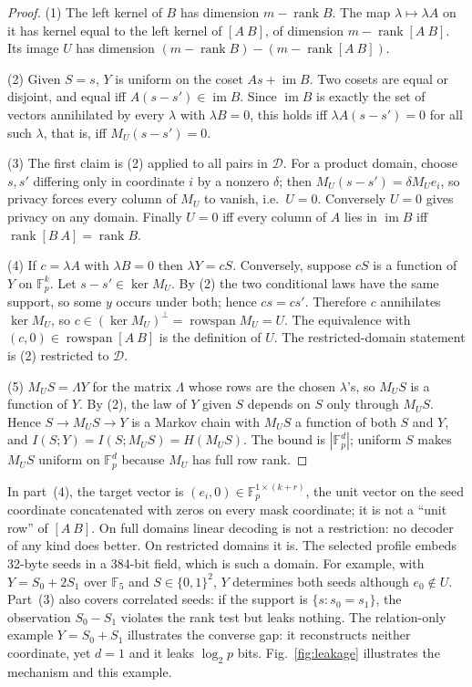 \documentclass[pdflatex,sn-mathphys-num]{sn-jnl}%
\theoremstyle{plain}
\theoremstyle{definition}
\newcommand{\F}{\mathbb{F}}
\newcommand{\rk}{\operatorname{rank}}
\newcommand{\im}{\operatorname{im}}
\begin{document}
\begin{proof}
(1) The left kernel of $B$ has dimension $m-\rk B$. The map $\lambda\mapsto\lambda A$ on it has kernel equal to the left kernel of $[A\ B]$, of dimension $m-\rk[A\ B]$. Its image $U$ has dimension $(m-\rk B)-(m-\rk[A\ B])$.

(2) Given $S=s$, $Y$ is uniform on the coset $As+\im B$. Two cosets are equal or disjoint, and equal iff $A(s-s')\in\im B$. Since $\im B$ is exactly the set of vectors annihilated by every $\lambda$ with $\lambda B=0$, this holds iff $\lambda A(s-s')=0$ for all such $\lambda$, that is, iff $M_U(s-s')=0$.

(3) The first claim is (2) applied to all pairs in $\mathcal D$. For a product domain, choose $s,s'$ differing only in coordinate $i$ by a nonzero $\delta$; then $M_U(s-s')=\delta M_U e_i$, so privacy forces every column of $M_U$ to vanish, i.e.\ $U=0$. Conversely $U=0$ gives privacy on any domain. Finally $U=0$ iff every column of $A$ lies in $\im B$ iff $\rk[B\ A]=\rk B$.

(4) If $c=\lambda A$ with $\lambda B=0$ then $\lambda Y=cS$. Conversely, suppose $cS$ is a function of $Y$ on $\F_p^k$. Let $s-s'\in\ker M_U$. By (2) the two conditional laws have the same support, so some $y$ occurs under both; hence $cs=cs'$. Therefore $c$ annihilates $\ker M_U$, so $c\in(\ker M_U)^\perp=\operatorname{rowspan}M_U=U$. The equivalence with $(c,0)\in\operatorname{rowspan}[A\ B]$ is the definition of $U$. The restricted-domain statement is (2) restricted to $\mathcal D$.

(5) $M_US=\Lambda Y$ for the matrix $\Lambda$ whose rows are the chosen $\lambda$'s, so $M_US$ is a function of $Y$. By (2), the law of $Y$ given $S$ depends on $S$ only through $M_US$. Hence $S\to M_US\to Y$ is a Markov chain with $M_US$ a function of both $S$ and $Y$, and $I(S;Y)=I(S;M_US)=H(M_US)$. The bound is $|\F_p^d|$; uniform $S$ makes $M_US$ uniform on $\F_p^d$ because $M_U$ has full row rank.
\end{proof}

In part~(4), the target vector is $(e_i,0)\in\F_p^{1\times(k+r)}$, the unit vector on the seed coordinate concatenated with zeros on every mask coordinate; it is not a ``unit row'' of $[A\ B]$. On full domains linear decoding is not a restriction: no decoder of any kind does better. On restricted domains it is. The selected profile embeds 32-byte seeds in a 384-bit field, which is such a domain. For example, with $Y=S_0+2S_1$ over $\F_5$ and $S\in\{0,1\}^2$, $Y$ determines both seeds although $e_0\notin U$. Part~(3) also covers correlated seeds: if the support is $\{s:s_0=s_1\}$, the observation $S_0-S_1$ violates the rank test but leaks nothing. The relation-only example $Y=S_0+S_1$ illustrates the converse gap: it reconstructs neither coordinate, yet $d=1$ and it leaks $\log_2p$ bits. Fig.~\ref{fig:leakage} illustrates the mechanism and this example.
\end{document}
